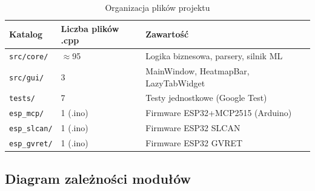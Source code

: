 \documentclass[12pt, a4paper]{article}
\begin{document}
\begin{table}[H]
\caption{Organizacja plików projektu}
\label{tab:files}
\centering
\small
\begin{tabular}{lll}
\toprule
\textbf{Katalog} & \textbf{Liczba plików .cpp} & \textbf{Zawartość} \\
\midrule
\texttt{src/core/}  & $\approx$95 & Logika biznesowa, parsery, silnik ML \\
\texttt{src/gui/}   & 3           & MainWindow, HeatmapBar, LazyTabWidget \\
\texttt{tests/}     & 7           & Testy jednostkowe (Google Test) \\
\texttt{esp\_mcp/}  & 1 (.ino)    & Firmware ESP32+MCP2515 (Arduino) \\
\texttt{esp\_slcan/} & 1 (.ino)   & Firmware ESP32 SLCAN \\
\texttt{esp\_gvret/} & 1 (.ino)   & Firmware ESP32 GVRET \\
\bottomrule
\end{tabular}
\end{table}

\subsection{Diagram zależności modułów}
\end{document}
